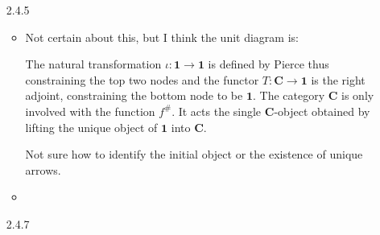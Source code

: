 \documentclass{article}
\newcommand{\one}{\mathbf{1}}
\newcommand{\cat}{\mathbf{C}}
\begin{document}
\begin{enumerate}
\item [2.4.5]
  \begin{itemize}
  \item 
    Not certain about this, but I think the unit diagram is:
    \begin{center}
    \end{center}
    The natural transformation $\iota : \one \rightarrow \one$ is defined by Pierce thus constraining the top two nodes and the functor $T : \cat \rightarrow \one$ is the right adjoint, constraining the bottom node to be $\one$.
    The category $\cat$ is only involved with the function $f^{\#}$.
    It acts the single $\cat$-object obtained by lifting the unique object of $\one$ into $\cat$.

    Not sure how to identify the initial object or the existence of unique arrows.
  \item 
  \end{itemize}
\item[]
\item[2.4.7]
\end{enumerate}
\end{document}
